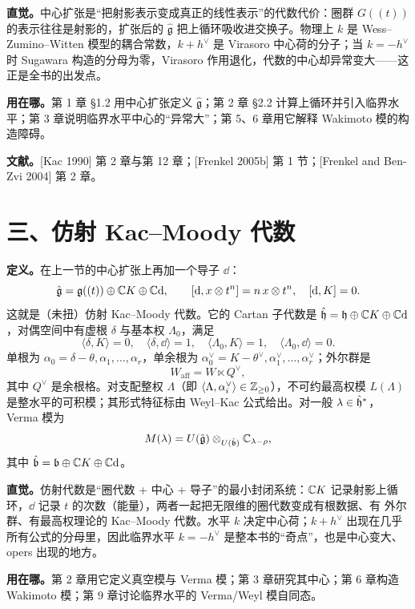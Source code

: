 \textbf{直觉。}中心扩张是“把射影表示变成真正的线性表示”的代数代价：圈群 $G((t))$ 的表示往往是射影的，扩张后的 $\hat{\mathfrak{g}}$ 把上循环吸收进交换子。物理上 $k$ 是 Wess--Zumino--Witten 模型的耦合常数，$k+h^\vee$ 是 Virasoro 中心荷的分子；当 $k=-h^\vee$ 时 Sugawara 构造的分母为零，Virasoro 作用退化，代数的中心却异常变大——这正是全书的出发点。

\textbf{用在哪。}第 1 章 §1.2 用中心扩张定义 $\hat{\mathfrak{g}}$；第 2 章 §2.2 计算上循环并引入临界水平；第 3 章说明临界水平中心的“异常大”；第 5、6 章用它解释 Wakimoto 模的构造障碍。

\textbf{文献。}[Kac 1990] 第 2 章与第 12 章；[Frenkel 2005b] 第 1 节；[Frenkel and Ben-Zvi 2004] 第 2 章。

\section*{三、仿射 Kac--Moody 代数}

\textbf{定义。}在上一节的中心扩张上再加一个导子 $\dd$：
\[
  \hat{\mathfrak{g}}=\mathfrak{g}((t))\oplus\mathbb{C} K\oplus\mathbb{C} \mathrm{d},\qquad
  [\mathrm{d},x\otimes t^n]=n\,x\otimes t^n,\quad [\mathrm{d},K]=0 .
\]
这就是（未扭）仿射 Kac--Moody 代数。它的 Cartan 子代数是 $\hat{\mathfrak{h}}=\mathfrak{h}\oplus\mathbb{C} K\oplus\mathbb{C} \mathrm{d}$，对偶空间中有虚根 $\delta$ 与基本权 $\Lambda_0$，满足
\[
  \langle \delta,K\rangle=0,\quad \langle\delta,\dd\rangle=1,\quad
  \langle\Lambda_0,K\rangle=1,\quad \langle\Lambda_0,\dd\rangle=0 .
\]
单根为 $\alpha_0=\delta-\theta,\alpha_1,\dots,\alpha_r$，单余根为 $\alpha_0^\vee=K-\theta^\vee,\alpha_1^\vee,\dots,\alpha_r^\vee$；外尔群是
\[
  W_{\mathrm{aff}}=W\ltimes Q^\vee ,
\]
其中 $Q^\vee$ 是余根格。对支配整权 $\Lambda$（即 $\langle\Lambda,\alpha_i^\vee\rangle\in\mathbb{Z}_{\ge0}$），不可约最高权模 $L(\Lambda)$ 是整水平的可积模；其形式特征标由 Weyl--Kac 公式给出。对一般 $\lambda\in\hat{\mathfrak{h}}^*$，Verma 模为
\[
  M(\lambda)=U(\hat{\mathfrak{g}})\otimes_{U(\hat{\mathfrak{b}})}\mathbb{C}_{\lambda-\rho},
\]
其中 $\hat{\mathfrak{b}}=\mathfrak{b}\oplus\mathbb{C} K\oplus\mathbb{C} \mathrm{d}$。

\textbf{直觉。}仿射代数是“圈代数 + 中心 + 导子”的最小封闭系统：$\mathbb{C} K$ 记录射影上循环，$\dd$ 记录 $t$ 的次数（能量），两者一起把无限维的圈代数变成有根数据、有 外尔群、有最高权理论的 Kac--Moody 代数。水平 $k$ 决定中心荷；$k+h^\vee$ 出现在几乎所有公式的分母里，因此临界水平 $k=-h^\vee$ 是整本书的“奇点”，也是中心变大、opers 出现的地方。

\textbf{用在哪。}第 2 章用它定义真空模与 Verma 模；第 3 章研究其中心；第 6 章构造 Wakimoto 模；第 9 章讨论临界水平的 Verma/Weyl 模自同态。


